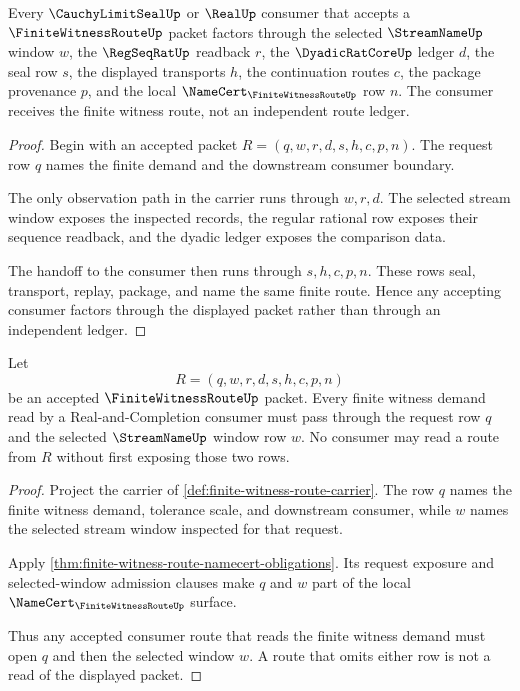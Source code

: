 \begin{theorem}
\label{thm:finite-witness-route-consumer-factorization}
Every $\CauchyLimitSealUp$ or $\RealUp$ consumer that accepts a $\FiniteWitnessRouteUp$ packet factors through the selected $\StreamNameUp$ window $w$, the $\RegSeqRatUp$ readback $r$, the $\DyadicRatCoreUp$ ledger $d$, the seal row $s$, the displayed transports $h$, the continuation routes $c$, the package provenance $p$, and the local $\NameCert_{\FiniteWitnessRouteUp}$ row $n$. The consumer receives the finite witness route, not an independent route ledger.
\end{theorem}
\begin{proof}
Begin with an accepted packet $R=(q,w,r,d,s,h,c,p,n)$. The request row $q$ names the finite demand and the downstream consumer boundary.

The only observation path in the carrier runs through $w,r,d$. The selected stream window exposes the inspected records, the regular rational row exposes their sequence readback, and the dyadic ledger exposes the comparison data.

The handoff to the consumer then runs through $s,h,c,p,n$. These rows seal, transport, replay, package, and name the same finite route. Hence any accepting consumer factors through the displayed packet rather than through an independent ledger.
\end{proof}

\begin{theorem}
\label{thm:finite-witness-route-request-window-admission}
Let
$$
R=(q,w,r,d,s,h,c,p,n)
$$
be an accepted $\FiniteWitnessRouteUp$ packet. Every finite witness demand read by a Real-and-Completion consumer must pass through the request row $q$ and the selected $\StreamNameUp$ window row $w$. No consumer may read a route from $R$ without first exposing those two rows.
\end{theorem}
\begin{proof}
Project the carrier of \autoref{def:finite-witness-route-carrier}. The row $q$ names the finite witness demand, tolerance scale, and downstream consumer, while $w$ names the selected stream window inspected for that request.

Apply \autoref{thm:finite-witness-route-namecert-obligations}. Its request exposure and selected-window admission clauses make $q$ and $w$ part of the local $\NameCert_{\FiniteWitnessRouteUp}$ surface.

Thus any accepted consumer route that reads the finite witness demand must open $q$ and then the selected window $w$. A route that omits either row is not a read of the displayed packet.
\end{proof}

